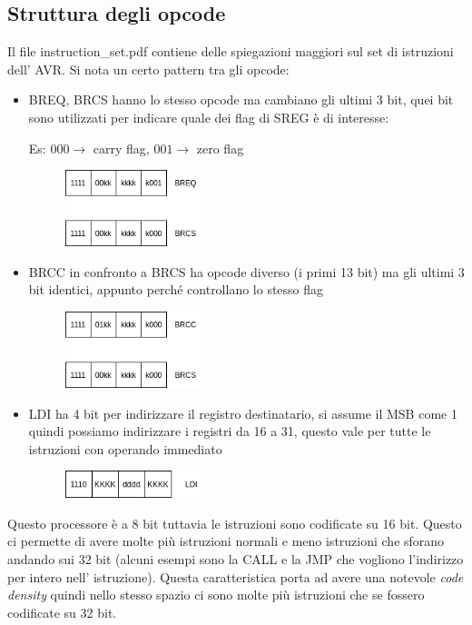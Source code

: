 \subsection{Struttura degli opcode}
Il file instruction\_set.pdf contiene delle spiegazioni maggiori sul set di istruzioni dell' AVR. Si nota un certo pattern tra gli opcode:
\begin{itemize}
    \item BREQ, BRCS hanno lo stesso opcode ma cambiano gli ultimi 3 bit, quei bit sono utilizzati per indicare quale dei flag di SREG è di interesse:

    Es: $000 \xrightarrow{}$ carry flag,
    $001 \xrightarrow{}$ zero flag

    \begin{figure}[H]
        \centering
        \includegraphics[width=150px]{images/6_Instruction_set/BREQ_BRCS_opcode.png}
    \end{figure}
    
    \item BRCC in confronto a BRCS ha opcode diverso (i primi 13 bit) ma gli ultimi 3 bit identici, appunto perché controllano lo stesso flag
    
    \begin{figure}[H]
        \centering
        \includegraphics[width=150px]{images/6_Instruction_set/BRCC_BRCS_opcode.png}
    \end{figure}
    
    \item LDI ha 4 bit per indirizzare il registro destinatario, si assume il MSB come 1 quindi possiamo indirizzare i registri da 16 a 31, questo vale per tutte le istruzioni con operando immediato

    \begin{figure}[H]
        \centering
        \includegraphics[width=150px]{images/6_Instruction_set/LDI_opcode.png}
    \end{figure}

\end{itemize}

Questo processore è a 8 bit tuttavia le istruzioni sono codificate su 16 bit.
Questo ci permette di avere molte più istruzioni normali e meno istruzioni che sforano andando sui 32 bit (alcuni esempi sono la CALL e la JMP che vogliono l'indirizzo per intero nell' istruzione).
Questa caratteristica porta ad avere una notevole \emph{code density} quindi nello stesso spazio ci sono molte più istruzioni che se fossero codificate su 32 bit.





